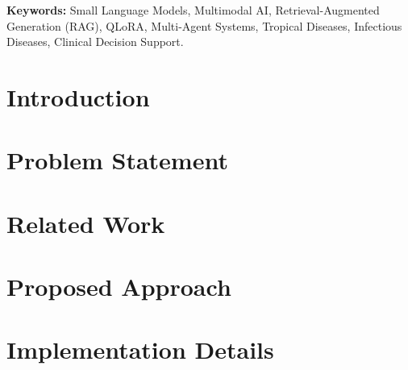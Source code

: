 \documentclass[11pt,a4paper]{report}
\begin{document}

\begin{abstract}
\noindent
This technical report investigates the design, implementation, and evaluation of Small Multimodal Models (SMMs) fine-tuned and augmented for clinical diagnosis in resource-constrained environments. We examine techniques including Retrieval-Augmented Generation (RAG), Quantized Low-Rank Adaptation (QLoRA), and multi-agent coordination architectures to assist healthcare providers in diagnosing tropical and infectious diseases.
\end{abstract}

\vspace{1cm}
\noindent\textbf{Keywords:} Small Language Models, Multimodal AI, Retrieval-Augmented Generation (RAG), QLoRA, Multi-Agent Systems, Tropical Diseases, Infectious Diseases, Clinical Decision Support.

\newpage
\tableofcontents
\newpage


\chapter{Introduction}
\label{ch:intro}


\chapter{Problem Statement}
\label{ch:problem}

\chapter{Related Work}
\label{ch:related}

\chapter{Proposed Approach}
\label{ch:approach}

\chapter{Implementation Details}
\label{ch:implementation}
\end{document}
